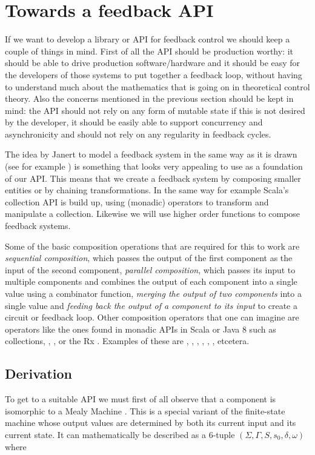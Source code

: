 \section{Towards a feedback API}
If we want to develop a library or API for feedback control we should keep a couple of things in mind. First of all the API should be production worthy: it should be able to drive production software/hardware and it should be easy for the developers of those systems to put together a feedback loop, without having to understand much about the mathematics that is going on in theoretical control theory. Also the concerns mentioned in the previous section should be kept in mind: the API should not rely on any form of mutable state if this is not desired by the developer, it should be easily able to support concurrency and asynchronicity and should not rely on any regularity in feedback cycles.

The idea by Janert to model a feedback system in the same way as it is drawn (see for example ) is something that looks very appealing to use as a foundation of our API. This means that we create a feedback system by composing smaller entities or by chaining transformations. In the same way for example Scala's collection API is build up, using (monadic) operators to transform and manipulate a collection. Likewise we will use higher order functions to compose feedback systems.

Some of the basic composition operations that are required for this to work are \textit{sequential composition}, which passes the output of the first component as the input of the second component, \textit{parallel composition}, which passes its input to multiple components and combines the output of each component into a single value using a combinator function, \textit{merging the output of two components} into a single value and \textit{feeding back the output of a component to its input} to create a circuit or feedback loop. Other composition operators that one can imagine are operators like the ones found in monadic APIs in Scala or Java 8 such as collections, , ,  or the Rx \obs. Examples of these are , , , , , , etcetera.

\subsection{Derivation}
\label{subsec:api-derivation}
To get to a suitable API we must first of all observe that a component is isomorphic to a Mealy Machine \cite{mealy1955-mealymachine}. This is a special variant of the finite-state machine whose output values are determined by both its current input and its current state. It can mathematically be described as a 6-tuple $(\Sigma, \Gamma, S, s_0, \delta, \omega)$ \cite{carroll1989-theoryoffiniteautomata} where

